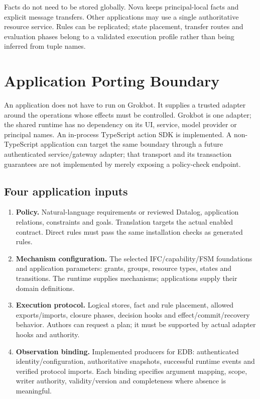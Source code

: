 \documentclass[10pt]{article}
\begin{document}
Facts do not need to be stored globally. Nova keeps principal-local facts and explicit
message transfers. Other applications may use a single authoritative resource service.
Rules can be replicated; state placement, transfer routes and evaluation phases belong
to a validated execution profile rather than being inferred from tuple names.

\section{Application Porting Boundary}\label{sec:porting}

An application does not have to run on Grokbot. It supplies a trusted adapter around
the operations whose effects must be controlled. Grokbot is one adapter; the shared
runtime has no dependency on its UI, service, model provider or principal names.
An in-process TypeScript action SDK is implemented. A non-TypeScript application can
target the same boundary through a future authenticated service/gateway adapter;
that transport and its transaction guarantees are not implemented by merely exposing
a policy-check endpoint.

\subsection{Four application inputs}

\begin{enumerate}[leftmargin=1.5em,itemsep=3pt]
\item \textbf{Policy.} Natural-language requirements or reviewed Datalog, application
relations, constraints and goals. Translation targets the actual enabled contract.
Direct rules must pass the same installation checks as generated rules.
\item \textbf{Mechanism configuration.} The selected IFC/capability/FSM foundations
and application parameters: grants, groups, resource types, states and transitions.
The runtime supplies mechanisms; applications supply their domain definitions.
\item \textbf{Execution protocol.} Logical stores, fact and rule placement, allowed
exports/imports, closure phases, decision hooks and effect/commit/recovery behavior.
Authors can request a plan; it must be supported by actual adapter hooks and authority.
\item \textbf{Observation binding.} Implemented producers for EDB: authenticated
identity/configuration, authoritative snapshots, successful runtime events and verified
protocol imports. Each binding specifies argument mapping, scope, writer authority,
validity/version and completeness where absence is meaningful.
\end{enumerate}
\end{document}
